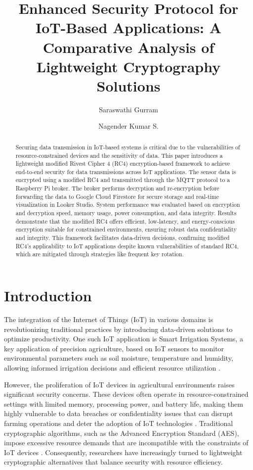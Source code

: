 \documentclass[runningheads]{llncs}
\title{Enhanced Security Protocol for IoT-Based Applications: A Comparative Analysis of Lightweight Cryptography Solutions}
\author{Saraswathi Gurram\inst{1}\orcidID{0000-0002-7654-3437} \and Nagender Kumar S.\inst{2}\orcidID{0000-0002-7786-9500}}
\institute{
University of Hyderabad, India \\
\email{22mcpc16@uohyd.ac.in} \\
\and
University of Hyderabad, India \\
\email{nks@uohyd.ac.in}
}
\begin{document}
\maketitle

\begin{abstract}
Securing data transmission in IoT-based systems is critical due to the vulnerabilities of resource-constrained devices and the sensitivity of data. This paper introduces a lightweight modified Rivest Cipher 4 (RC4) encryption-based framework to achieve end-to-end security for data transmissions across IoT applications. The sensor data is encrypted using a modified RC4 and transmitted through the MQTT protocol to a Raspberry Pi broker. The broker performs decryption and re-encryption before forwarding the data to Google Cloud Firestore for secure storage and real-time visualization in Looker Studio. System performance was evaluated based on encryption and decryption speed, memory usage, power consumption, and data integrity. Results demonstrate that the modified RC4 offers efficient, low-latency, and energy-conscious encryption suitable for constrained environments, ensuring robust data confidentiality and integrity. This framework facilitates data-driven decisions, confirming modified RC4’s applicability to IoT applications despite known vulnerabilities of standard RC4, which are mitigated through strategies like frequent key rotation.
\end{abstract}




\section{Introduction}
The integration of the Internet of Things (IoT) in various domains is revolutionizing traditional practices by introducing data-driven solutions to optimize productivity. One such IoT application is Smart Irrigation Systems, a key application of precision agriculture, based on IoT sensors to monitor environmental parameters such as soil moisture, temperature and humidity, allowing informed irrigation decisions and efficient resource utilization \cite{ref7}.

However, the proliferation of IoT devices in agricultural environments raises significant security concerns. These devices often operate in resource-constrained settings with limited memory, processing power, and battery life, making them highly vulnerable to data breaches or confidentiality issues that can disrupt farming operations and deter the adoption of IoT technologies \cite{ref8}. Traditional cryptographic algorithms, such as the Advanced Encryption Standard (AES), impose excessive resource demands that are incompatible with the constraints of IoT devices \cite{ref2,ref8}. Consequently, researchers have increasingly turned to lightweight cryptographic alternatives that balance security with resource efficiency.
\end{document}
